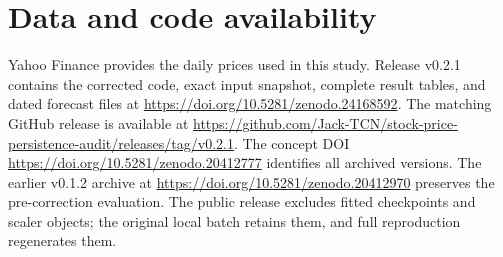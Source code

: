 \section{Data and code availability}

Yahoo Finance provides the daily prices used in this study. Release v0.2.1 contains the corrected code, exact input snapshot, complete result tables, and dated forecast files at \url{https://doi.org/10.5281/zenodo.24168592}. The matching GitHub release is available at \url{https://github.com/Jack-TCN/stock-price-persistence-audit/releases/tag/v0.2.1}. The concept DOI \url{https://doi.org/10.5281/zenodo.20412777} identifies all archived versions. The earlier v0.1.2 archive at \url{https://doi.org/10.5281/zenodo.20412970} preserves the pre-correction evaluation. The public release excludes fitted checkpoints and scaler objects; the original local batch retains them, and full reproduction regenerates them.
